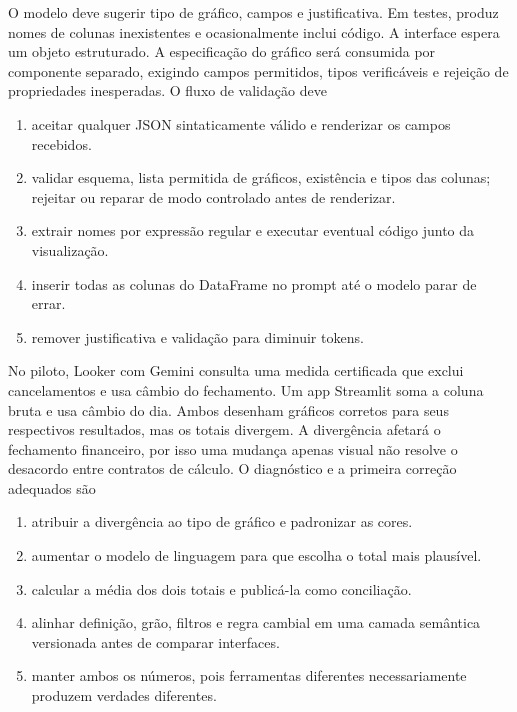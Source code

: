 \documentclass[12pt,a4paper]{article}
\begin{document}
\TextoBase
O modelo deve sugerir tipo de gráfico, campos e justificativa. Em testes, produz nomes de colunas inexistentes e ocasionalmente inclui código. A interface espera um objeto estruturado.
A especificação do gráfico será consumida por componente separado, exigindo campos permitidos, tipos verificáveis e rejeição de propriedades inesperadas.
\FonteDidatica
\Comando O fluxo de validação deve
\begin{enumerate}[label=\Alph*)]
  \item aceitar qualquer JSON sintaticamente válido e renderizar os campos recebidos.
  \item validar esquema, lista permitida de gráficos, existência e tipos das colunas; rejeitar ou reparar de modo controlado antes de renderizar.
  \item extrair nomes por expressão regular e executar eventual código junto da visualização.
  \item inserir todas as colunas do DataFrame no prompt até o modelo parar de errar.
  \item remover justificativa e validação para diminuir tokens.
\end{enumerate}

\TextoBase
No piloto, Looker com Gemini consulta uma medida certificada que exclui cancelamentos e usa câmbio do fechamento. Um app Streamlit soma a coluna bruta e usa câmbio do dia. Ambos desenham gráficos corretos para seus respectivos resultados, mas os totais divergem.
A divergência afetará o fechamento financeiro, por isso uma mudança apenas visual não resolve o desacordo entre contratos de cálculo.
\FonteDidatica
\Comando O diagnóstico e a primeira correção adequados são
\begin{enumerate}[label=\Alph*)]
  \item atribuir a divergência ao tipo de gráfico e padronizar as cores.
  \item aumentar o modelo de linguagem para que escolha o total mais plausível.
  \item calcular a média dos dois totais e publicá-la como conciliação.
  \item alinhar definição, grão, filtros e regra cambial em uma camada semântica versionada antes de comparar interfaces.
  \item manter ambos os números, pois ferramentas diferentes necessariamente produzem verdades diferentes.
\end{enumerate}
\end{document}
